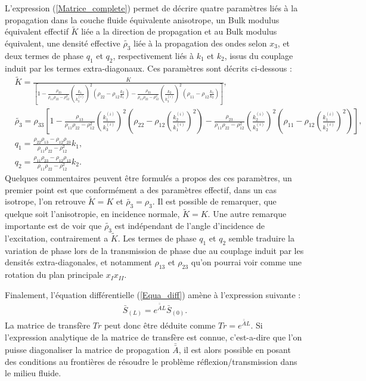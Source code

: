 \documentclass[12pt]{report}
\begin{document}
	L'expression (\ref{Matrice_complete}) permet de décrire quatre paramètres liés à la propagation dans la couche fluide équivalente anisotrope, un Bulk modulus équivalent effectif $\tilde{K}$ liée a la direction de propagation et au Bulk modulus équivalent, une densité effective $\tilde{\rho_3}$ liée à la propagation des ondes selon $x_3$, et deux termes de phase $q_1$ et $q_2$, respectivement liés à $k_1$ et $k_2$, issus du couplage induit par les termes extra-diagonaux. Ces paramètres sont décrits ci-dessous :
    \begin{align}
     &\tilde{K}=\frac{K}{[1-\frac{\rho_{33}}{\rho_{11}\rho_{22}-\rho_{12}^2}(\frac{k_1}{k_3^{(i)}})^2(\rho_{22}-\rho_{12}\frac{k_2}{k_1})-\frac{\rho_{33}}{\rho_{11}\rho_{22}-\rho_{12}^2}(\frac{k_2}{k_3^{(i)}})^2(\rho_{11}-\rho_{12}\frac{k_1}{k_2})]}\label{Ktild},\\
     &\tilde{\rho_3}=\rho_{33}[1-\frac{\rho_{13}}{\rho_{11}\rho_{22}-\rho_{12}^2}(\frac{k_1^{(i)}}{k_3^{(i)}})^2(\rho_{22}-\rho_{12}(\frac{k_2^{(i)}}{k_1^{(i)}})^2)-\frac{\rho_{23}}{\rho_{11}\rho_{22}-\rho_{12}^2}(\frac{k_2^{(i)}}{k_3^{(i)}})^2(\rho_{11}-\rho_{12}(\frac{k_1^{(i)}}{k_2^{(i)}})^2)]\label{rho3tild}, \\
	&q_{1}=\frac{\rho_{22}\rho_{13}-\rho_{12}\rho_{23}}{\rho_{11}\rho_{22}-\rho_{12}^2}k_1\label{q1},\\
    &q_{2}= \frac{\rho_{11}\rho_{23}-\rho_{12}\rho_{13}}{\rho_{11}\rho_{22}-\rho_{12}^2}k_2\label{q2}.
          \end{align}
    Quelques commentaires peuvent être formulés a propos des ces paramètres, un premier point est que conformément a des paramètres effectif, dans un cas isotrope, l'on retrouve  $\tilde{K}=K$ et $\tilde{\rho_3}=\rho_3$. Il est possible de remarquer, que quelque soit l'anisotropie, en incidence normale, $\tilde{K}=K$. Une autre remarque importante est de voir que $\tilde{\rho_3}$ est indépendant de l'angle d'incidence de l'excitation, contrairement a $\tilde{K}$. Les termes de phase $q_1$ et $q_2$ semble traduire la variation de phase lors de la transmission de phase due au couplage induit par les densités extra-diagonales, et notamment $\rho_{13}$ et $\rho_{23}$  qu'on pourrai voir comme une rotation du plan principale $x_Ix_{II}$.
    
    Finalement, l'équation différentielle (\ref{Equa_diff}) amène à l'expression suivante : 
    \begin{align}
    \bar{S}_{(L)}=e^{\bar{\bar{A}}L}\bar{S}_{(0)}.\label{PB}
    \end{align}
    La matrice de transfère $Tr$ peut donc être déduite comme $Tr=e^{\bar{\bar{A}}L}$. Si l'expression analytique de la matrice de transfère est connue, c'est-a-dire que l'on puisse diagonaliser la matrice de propagation $\bar{\bar{A}}$, il est alors possible en posant des conditions au frontières de résoudre le problème réflexion/transmission dans le milieu fluide.
    
\end{document}
